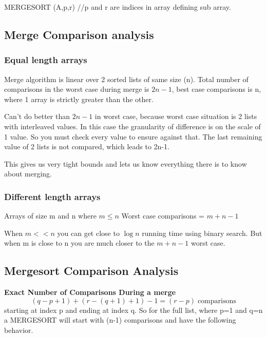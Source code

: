\documentclass[english, 10pt]{article}
\begin{document}
\begin{algorithm}[H]
    MERGESORT (A,p,r)\;
    //p and r are indices in array defining sub array.\;
\end{algorithm}


\subsection{Merge Comparison analysis}
\subsubsection{Equal length arrays}
Merge algorithm is linear over 2 sorted lists of same size (n). Total number of comparisons in the worst case during merge is $2n-1$, best case comparisons is n, where
1 array is strictly greater than the other.

Can't do better than $2n-1$ in worst case, because worst case situation is 2 lists with interleaved values. In this case the granularity of difference is on the scale of 1 value. So you must check every value to ensure against that. The last remaining value of 2 lists is not compared, which leads to 2n-1.

This gives us very tight bounds and lets us know everything there is to know about merging.

\subsubsection{Different length arrays}
Arrays of size m and n where $m\le n$ Worst case comparisons = $m+n-1$

When $m<<n$ you can get close to $\log n$ running time using binary search. But when m is close to n you are much closer to the $m+n-1$ worst case.


\subsection{Mergesort Comparison Analysis}
\textbf{Exact Number of Comparisons During a merge}
$$ (q-p+1) + (r-(q+1)+1) -1 = (r-p)\; \text{comparisons} $$
starting at index p and ending at index q. So for the full list, where p=1 and q=n a MERGESORT will start with (n-1) comparisons and have the following behavior.
\end{document}
